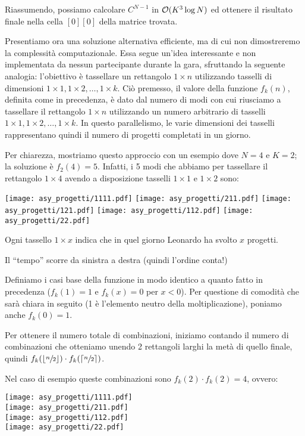 \begin{solution}
Riassumendo, possiamo calcolare $C^{N-1}$ in $\mathcal{O}(K^3 \log N)$ ed ottenere il risultato finale nella cella $[0][0]$ della matrice trovata.


\comb
Presentiamo ora una soluzione alternativa efficiente, ma di cui non dimostreremo la complessità computazionale. Essa segue un'idea interessante e non implementata da nessun partecipante durante la gara, sfruttando la seguente analogia: l'obiettivo è tassellare un rettangolo $1 \times n$ utilizzando tasselli di dimensioni $1 \times 1, 1 \times 2, \ldots, 1 \times k$. Ciò premesso, il valore della funzione $f_k(n)$, definita come in precedenza, è dato dal numero di modi con cui riusciamo a tassellare il rettangolo $1 \times n$ utilizzando un numero arbitrario di tasselli $1 \times 1, 1 \times 2, \ldots, 1 \times k$. In questo parallelismo, le varie dimensioni dei tasselli rappresentano quindi il numero di progetti completati in un giorno.

Per chiarezza, mostriamo questo approccio con un esempio dove $N=4$ e $K=2$; la soluzione è $f_2(4)=5$. Infatti, i 5 modi che abbiamo per tassellare il rettangolo $1 \times 4$ avendo a disposizione tasselli $1 \times 1$ e $1 \times 2$ sono:

\begin{center}
\texttt{[image: asy\_progetti/1111.pdf]}
\texttt{[image: asy\_progetti/211.pdf]}
\texttt{[image: asy\_progetti/121.pdf]}
\texttt{[image: asy\_progetti/112.pdf]}
\texttt{[image: asy\_progetti/22.pdf]}

Ogni tassello $1 \times x$ indica che in quel giorno Leonardo ha svolto $x$ progetti.

Il ``tempo'' scorre da sinistra a destra (quindi l'ordine conta!)
\end{center}

Definiamo i casi base della funzione in modo identico a quanto fatto in precedenza ($f_k(1) = 1$ e $f_k(x) = 0$ per $x < 0$). Per questione di comodità che sarà chiara in seguito (1 è l'elemento neutro della moltiplicazione), poniamo anche $f_k(0) = 1$.

Per ottenere il numero totale di combinazioni, iniziamo contando il numero di combinazioni che otteniamo unendo 2 rettangoli larghi la metà di quello finale, quindi $f_k(\lfloor\sfrac{n}{2}\rfloor) \cdot f_k(\lceil\sfrac{n}{2}\rceil)$.

Nel caso di esempio queste combinazioni sono $f_k(2) \cdot f_k(2)=4$, ovvero:
\begin{center}
\texttt{[image: asy\_progetti/1111.pdf]} \\
\texttt{[image: asy\_progetti/211.pdf]} \\
\texttt{[image: asy\_progetti/112.pdf]} \\
\texttt{[image: asy\_progetti/22.pdf]} \\
\end{center}


\end{solution}
